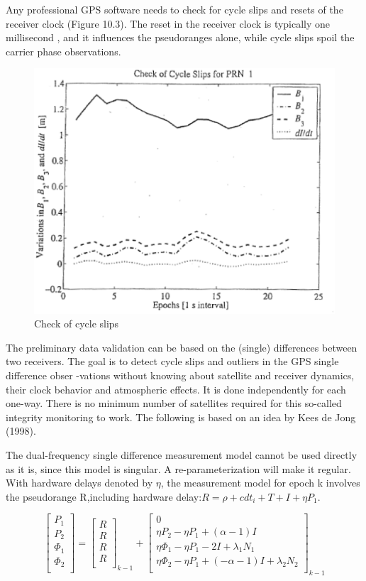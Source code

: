 Any professional GPS software needs to check for cycle slips and resets of the receiver clock (Figure 10.3). The reset in the receiver clock is typically one millisecond , and it influences the pseudoranges alone, while cycle slips spoil the carrier phase observations.

\begin{figure}
	\centering
	\includegraphics[width=0.4\linewidth]{TeX_files/Part03/chapter10/image/9-3}
	\caption{Check of cycle slips}
	\label{fig:9-3}
\end{figure}

The preliminary data validation can be based on the (single) differences between two receivers. The goal is to detect cycle slips and outliers in the GPS single difference obser
-vations without knowing about satellite and receiver dynamics, their clock behavior and atmospheric effects. It is done independently for each one-way. There is no minimum number of satellites required for this so-called integrity monitoring to work. The following is based on an idea by Kees de Jong (1998).

The dual-frequency single difference measurement model cannot be used directly as it is, since this model is singular. A re-parameterization will make it regular. With hardware delays denoted by $\eta$, the measurement model for epoch k involves the pseudorange R,including hardware delay:$R=\rho+cdt_{i}+T+I+\eta P_{1}$.

\begin{equation}
\begin{bmatrix}
P_{1}\\
P_{2}\\
\Phi_{1}\\
\Phi_{2}\\
\end{bmatrix}
=\begin{bmatrix}
R\\
R\\
R\\
R\\
\end{bmatrix}_{k-1}
+
\begin{bmatrix}
0\\
\eta P_{2}-\eta P_{1}+(\alpha-1)I\\
\eta \Phi_{1}-\eta P_{1}-2I+\lambda_{1}N_{1}\\
\eta \Phi_{2}-\eta P_{1}+(-\alpha-1)I+\lambda_{2}N_{2}\\
\end{bmatrix}_{k-1}
\end{equation}

